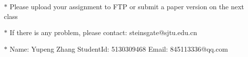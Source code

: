 \documentclass[12pt,a4paper]{article}
\theoremstyle{definition}
\numberwithin{equation}{section}
\numberwithin{figure}{section}
\begin{document}
\noindent

\noindent{}
\begin{center}
\footnotesize{\color{red}$*$ Please upload your assignment to FTP or submit a paper version on the next class}

\footnotesize{\color{red}$*$ If there is any problem, please contact: steinsgate@sjtu.edu.cn}

\footnotesize{\color{blue}$*$ Name: Yupeng Zhang \quad StudentId: 5130309468 \quad Email: 845113336@qq.com}
\end{center}
\end{document}
